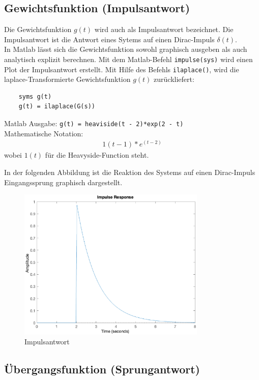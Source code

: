\subsection{Gewichtsfunktion (Impulsantwort)}
Die Gewichtsfunktion $g(t)$ wird auch als Impulsantwort bezeichnet.
Die Impulsantwort ist die Antwort eines Sytems auf einen Dirac-Impuls $\delta(t)$.\\
In Matlab lässt sich die Gewichtsfunktion sowohl graphisch ausgeben als auch analytisch explizit berechnen.
Mit dem Matlab-Befehl \texttt{impulse(sys)} wird einen Plot der Impulsantwort erstellt. Mit Hilfe des Befehls \texttt{ilaplace()}, wird die laplace-Transformierte  Gewichtsfunktion $g(t)$ zurückliefert:
\begin{verbatim}
    syms g(t)
    g(t) = ilaplace(G(s))
\end{verbatim}

Matlab Ausgabe: \texttt{g(t) = heaviside(t - 2)*exp(2 - t)}\\
Mathematische Notation: 
\begin{align*}
    1(t-1)*e^{(t-2)}
\end{align*} wobei $1(t)$ für die Heavyside-Function steht.

\newpage
In der folgenden Abbildung ist die Reaktion des Systems auf einen Dirac-Impuls Eingangssprung graphisch dargestellt.

\begin{figure}[H]
    \label{fig:impuls}
    \centering
    \includegraphics[width=0.8\textwidth]{Bilder/ImpulsAntwortPT1Tt.eps}
    \caption{Impulsantwort}
 \end{figure}

\subsection{Übergangsfunktion (Sprungantwort)}

